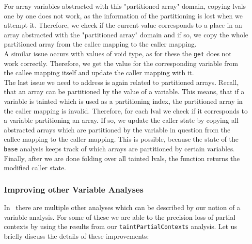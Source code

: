       For array variables abstracted with this "partitioned array" domain, copying \ac{lval}s one by one does not work, as the information of the partitioning is lost when we attempt it. Therefore, we check if the current value corresponds to a place in an array abstracted with the "partitioned array" domain and if so, we copy the whole partitioned array from the callee mapping to the caller mapping.\\
      A similar issue occurs with values of void type, as for these the \texttt{get} does not work correctly. Therefore, we get the value for the corresponding variable from the callee mapping itself and update the caller mapping with it.\\
      The last issue we need to address is again related to partitioned arrays. Recall, that an array can be partitioned by the value of a variable. This means, that if a variable is tainted which is used as a partitioning index, the partitioned array in the caller mapping is invalid. Therefore, for each \ac{lval} we check if it corresponds to a variable partitioning an array. If so, we update the caller state by copying all abstracted arrays which are partitioned by the variable in question from the callee mapping to the caller mapping. This is possible, because the state of the \texttt{base} analysis keeps track of which arrays are partitioned by certain variables.\\
      Finally, after we are done folding over all tainted \ac{lval}s, the function returns the modified caller state.

    \subsubsection{Improving other Variable Analyses}
      In \gob\ there are multiple other analyses which can be described by our notion of a variable analysis. For some of these we are able to the precision loss of partial contexts by using the results from our \texttt{taintPartialContexts} analysis. Let us briefly discuss the details of these improvements:

